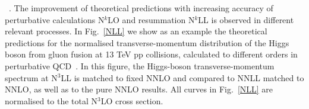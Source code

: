 ~\cite{Bozzi:2005wk,Bauer:2002nz,Banfi:2004nk,Becher:2010tm,Stewart:2010pd,Banfi:2011dx,Berger:2010xi,Jouttenus:2011wh,Becher:2012qa,Zhu:2012ts,Banfi:2012jm,Becher:2013xia,Stewart:2013faa,Procura:2014cba,Li:2016ctv,Monni:2016ktx,Bizon:2017rah}.
The improvement of theoretical predictions   with increasing  accuracy of perturbative calculations    N$^k$LO  and  resummation  N$^k$LL is observed in different relevant  processes. In Fig.~\ref{NLL} we show 
 as an example   the  theoretical predictions for  the normalised  transverse-momentum  distribution  of the  Higgs  boson from  gluon fusion  at  13 TeV pp collisions,
 calculated to  different orders in perturbative QCD~\cite{Bizon:2017rah}.
  In this figure,
   the Higgs-boson transverse-momentum spectrum at N$^3$LL   is matched to fixed  NNLO   and compared to NNLL   matched to NNLO, as well as  to the pure    NNLO results.  All curves in Fig.~\ref{NLL}  are normalised to the  total  N$^3$LO cross section.

